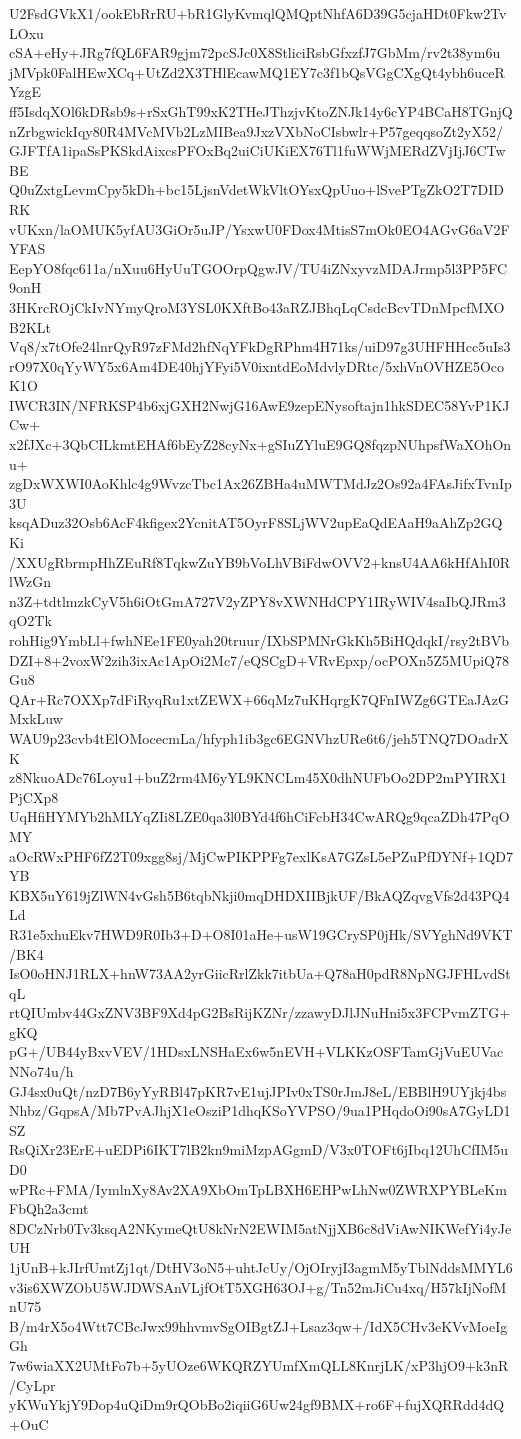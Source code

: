 U2FsdGVkX1/ookEbRrRU+bR1GlyKvmqlQMQptNhfA6D39G5cjaHDt0Fkw2TvLOxu
cSA+eHy+JRg7fQL6FAR9gjm72pcSJc0X8StliciRsbGfxzfJ7GbMm/rv2t38ym6u
jMVpk0FalHEwXCq+UtZd2X3THlEcawMQ1EY7c3f1bQsVGgCXgQt4ybh6uceRYzgE
ff5IsdqXOl6kDRsb9s+rSxGhT99xK2THeJThzjvKtoZNJk14y6cYP4BCaH8TGnjQ
nZrbgwickIqy80R4MVcMVb2LzMIBea9JxzVXbNoCIsbwlr+P57geqqsoZt2yX52/
GJFTfA1ipaSsPKSkdAixcsPFOxBq2uiCiUKiEX76Tl1fuWWjMERdZVjIjJ6CTwBE
Q0uZxtgLevmCpy5kDh+bc15LjsnVdetWkVltOYsxQpUuo+lSvePTgZkO2T7DIDRK
vUKxn/laOMUK5yfAU3GiOr5uJP/YsxwU0FDox4MtisS7mOk0EO4AGvG6aV2FYFAS
EepYO8fqc611a/nXuu6HyUuTGOOrpQgwJV/TU4iZNxyvzMDAJrmp5l3PP5FC9onH
3HKrcROjCkIvNYmyQroM3YSL0KXftBo43aRZJBhqLqCsdcBcvTDnMpcfMXOB2KLt
Vq8/x7tOfe24lnrQyR97zFMd2hfNqYFkDgRPhm4H71ks/uiD97g3UHFHHcc5uIs3
rO97X0qYyWY5x6Am4DE40hjYFyi5V0ixntdEoMdvlyDRtc/5xhVnOVHZE5OcoK1O
IWCR3IN/NFRKSP4b6xjGXH2NwjG16AwE9zepENysoftajn1hkSDEC58YvP1KJCw+
x2fJXc+3QbCILkmtEHAf6bEyZ28cyNx+gSIuZYluE9GQ8fqzpNUhpsfWaXOhOnu+
zgDxWXWI0AoKhlc4g9WvzcTbc1Ax26ZBHa4uMWTMdJz2Os92a4FAsJifxTvnIp3U
ksqADuz32Osb6AcF4kfigex2YcnitAT5OyrF8SLjWV2upEaQdEAaH9aAhZp2GQKi
/XXUgRbrmpHhZEuRf8TqkwZuYB9bVoLhVBiFdwOVV2+knsU4AA6kHfAhI0RlWzGn
n3Z+tdtlmzkCyV5h6iOtGmA727V2yZPY8vXWNHdCPY1IRyWIV4saIbQJRm3qO2Tk
rohHig9YmbLl+fwhNEe1FE0yah20truur/IXbSPMNrGkKh5BiHQdqkI/rsy2tBVb
DZI+8+2voxW2zih3ixAc1ApOi2Mc7/eQSCgD+VRvEpxp/ocPOXn5Z5MUpiQ78Gu8
QAr+Rc7OXXp7dFiRyqRu1xtZEWX+66qMz7uKHqrgK7QFnIWZg6GTEaJAzGMxkLuw
WAU9p23cvb4tElOMocecmLa/hfyph1ib3gc6EGNVhzURe6t6/jeh5TNQ7DOadrXK
z8NkuoADc76Loyu1+buZ2rm4M6yYL9KNCLm45X0dhNUFbOo2DP2mPYIRX1PjCXp8
UqHfiHYMYb2hMLYqZIi8LZE0qa3l0BYd4f6hCiFcbH34CwARQg9qcaZDh47PqOMY
aOcRWxPHF6fZ2T09xgg8sj/MjCwPIKPPFg7exlKsA7GZsL5ePZuPfDYNf+1QD7YB
KBX5uY619jZlWN4vGsh5B6tqbNkji0mqDHDXIIBjkUF/BkAQZqvgVfs2d43PQ4Ld
R31e5xhuEkv7HWD9R0Ib3+D+O8I01aHe+usW19GCrySP0jHk/SVYghNd9VKT/BK4
IsO0oHNJ1RLX+hnW73AA2yrGiicRrlZkk7itbUa+Q78aH0pdR8NpNGJFHLvdStqL
rtQIUmbv44GxZNV3BF9Xd4pG2BsRijKZNr/zzawyDJlJNuHni5x3FCPvmZTG+gKQ
pG+/UB44yBxvVEV/1HDsxLNSHaEx6w5nEVH+VLKKzOSFTamGjVuEUVacNNo74u/h
GJ4sx0uQt/nzD7B6yYyRBl47pKR7vE1ujJPIv0xTS0rJmJ8eL/EBBlH9UYjkj4bs
Nhbz/GqpsA/Mb7PvAJhjX1eOsziP1dhqKSoYVPSO/9ua1PHqdoOi90sA7GyLD1SZ
RsQiXr23ErE+uEDPi6IKT7lB2kn9miMzpAGgmD/V3x0TOFt6jIbq12UhCfIM5uD0
wPRc+FMA/IymlnXy8Av2XA9XbOmTpLBXH6EHPwLhNw0ZWRXPYBLeKmFbQh2a3cmt
8DCzNrb0Tv3ksqA2NKymeQtU8kNrN2EWIM5atNjjXB6c8dViAwNIKWefYi4yJeUH
1jUnB+kJIrfUmtZj1qt/DtHV3oN5+uhtJcUy/OjOIryjI3agmM5yTblNddsMMYL6
v3is6XWZObU5WJDWSAnVLjfOtT5XGH63OJ+g/Tn52mJiCu4xq/H57kIjNofMnU75
B/m4rX5o4Wtt7CBcJwx99hhvmvSgOIBgtZJ+Lsaz3qw+/IdX5CHv3eKVvMoeIgGh
7w6wiaXX2UMtFo7b+5yUOze6WKQRZYUmfXmQLL8KnrjLK/xP3hjO9+k3nR/CyLpr
yKWuYkjY9Dop4uQiDm9rQObBo2iqiiG6Uw24gf9BMX+ro6F+fujXQRRdd4dQ+OuC
